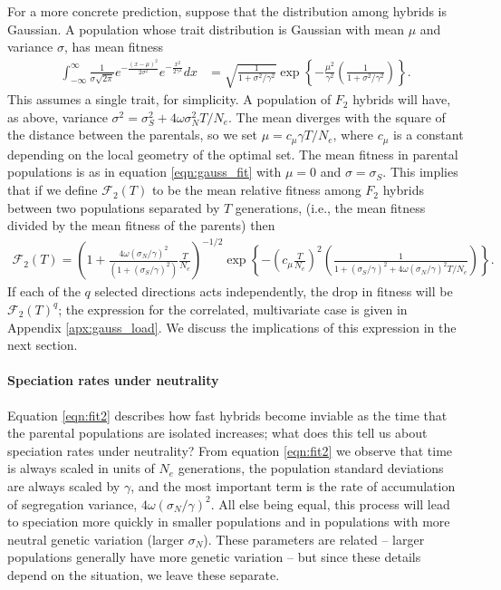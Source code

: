 \documentclass{article}
\newcommand{\1}{\mathbbm{1}}
\newcommand{\fit}{\mathcal{F}}
\begin{document}
For a more concrete prediction, suppose that the distribution among hybrids is Gaussian.
A population whose trait distribution is Gaussian with mean $\mu$ and variance $\sigma$,
has mean fitness 
\begin{align} \label{eqn:gauss_fit}
\int_{-\infty}^\infty \frac{1}{\sigma\sqrt{2\pi}} e^{-\frac{(x-\mu)^2}{2\sigma^2}} e^{-\frac{x^2}{2\gamma^2}} dx
&=
\sqrt{\frac{1}{1 + \sigma^2/\gamma^2}} \exp\left\{-\frac{\mu^2}{\gamma^2}\left(\frac{1}{1 + \sigma^2/\gamma^2}\right)\right\} .
\end{align}
This assumes a single trait, for simplicity. %
A population of $F_2$ hybrids will have, as above, variance $\sigma^2 = \sigma^2_S + 4 \omega \sigma^2_N T/N_e$.
The mean diverges with the square of the distance between the parentals, so we set $\mu = c_\mu \gamma T/N_e$,
where $c_\mu$ is a constant depending on the local geometry of the optimal set.
The mean fitness in parental populations is as in equation \ref{eqn:gauss_fit} with $\mu=0$ and $\sigma = \sigma_S$.
This implies that if we define $\fit_2(T)$ to be the mean relative fitness among $F_2$ hybrids
between two populations separated by $T$ generations, 
(i.e., the mean fitness divided by the mean fitness of the parents)
then
\begin{align} \label{eqn:fit2}
\fit_2(T) = 
  \left(1 + \frac{4 \omega (\sigma_N/\gamma)^2}{(1 + (\sigma_S/\gamma)^2)} \frac{T}{N_e} \right)^{-1/2} 
     \exp\left\{-\left(c_\mu \frac{T}{N_e}\right)^2 \left(\frac{1}{1 + (\sigma_S/\gamma)^2 + 4 \omega (\sigma_N/\gamma)^2 T/N_e}\right)\right\} .
\end{align}
If each of the $q$ selected directions acts independently,
the drop in fitness will be $\fit_2(T)^q$;
the expression for the correlated, multivariate case is given in Appendix \ref{apx:gauss_load}.
We discuss the implications of this expression in the next section.


\paragraph{Speciation rates under neutrality}
Equation \eqref{eqn:fit2} describes how fast hybrids become inviable 
as the time that the parental populations are isolated increases;
what does this tell us about speciation rates under neutrality?
From equation \eqref{eqn:fit2} we observe that
time is always scaled in units of $N_e$ generations,
the population standard deviations are always scaled by $\gamma$,
and the most important term is the rate of accumulation of segregation variance,
$4 \omega (\sigma_N/\gamma)^2$.
All else being equal, this process will lead to speciation more quickly in smaller populations
and in populations with more neutral genetic variation (larger $\sigma_N$).
These parameters are related -- larger populations generally have more genetic variation --
but since these details depend on the situation, we leave these separate.
\end{document}
